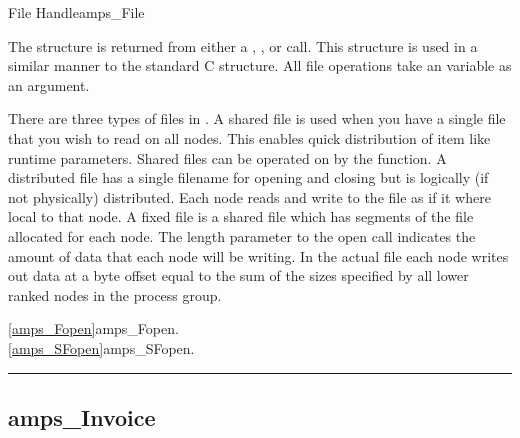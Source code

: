 \begin{deftp}{File Handle}{amps\_File}

\DESCRIPTION

The  structure is returned from either a
, , or  call.  This
structure is used in a similar manner to the standard C 
structure.  All file operations take an  variable as an
argument.

There are three types of files in .  A shared file is used
when you have a single file that you wish to read on all nodes.  This
enables quick distribution of item like runtime parameters.  Shared
files can be operated on by the  function.  A
distributed file has a single filename for opening and closing but is
logically (if not physically) distributed.  Each node reads and write
to the file as if it where local to that node.  A fixed file is a
shared file which has segments of the file allocated for each node.
The length parameter to the open  call indicates the
amount of data that each node will be writing.  In the actual file
each node writes out data at a byte offset equal to the sum of the
sizes specified by all lower ranked nodes in the process group.

\SEEALSO
\vref{amps_Fopen}{amps\_Fopen}. \\
\vref{amps_SFopen}{amps\_SFopen}. \\

\end{deftp}


\noindent\rule{\textwidth}{1mm}

\subsection{amps\_Invoice}
\label{amps_Invoice}



